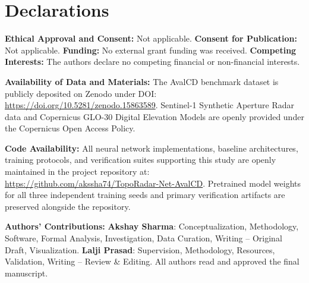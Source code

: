 \section*{Declarations}

\noindent\textbf{Ethical Approval and Consent:} Not applicable. \quad
\textbf{Consent for Publication:} Not applicable. \quad
\textbf{Funding:} No external grant funding was received. \quad
\textbf{Competing Interests:} The authors declare no competing financial or non-financial interests.

\smallskip
\noindent\textbf{Availability of Data and Materials:} The AvalCD benchmark dataset is publicly deposited on Zenodo under DOI: \url{https://doi.org/10.5281/zenodo.15863589}. Sentinel-1 Synthetic Aperture Radar data and Copernicus GLO-30 Digital Elevation Models are openly provided under the Copernicus Open Access Policy.

\smallskip
\noindent\textbf{Code Availability:} All neural network implementations, baseline architectures, training protocols, and verification suites supporting this study are openly maintained in the project repository at: \url{https://github.com/akssha74/TopoRadar-Net-AvalCD}. Pretrained model weights for all three independent training seeds and primary verification artifacts are preserved alongside the repository.

\smallskip
\noindent\textbf{Authors' Contributions:} \textbf{Akshay Sharma}: Conceptualization, Methodology, Software, Formal Analysis, Investigation, Data Curation, Writing -- Original Draft, Visualization. \textbf{Lalji Prasad}: Supervision, Methodology, Resources, Validation, Writing -- Review \& Editing. All authors read and approved the final manuscript.
